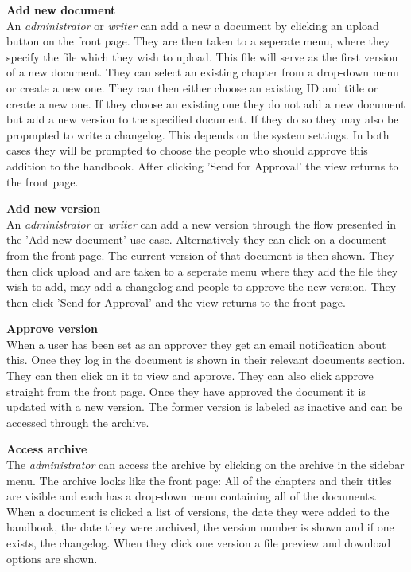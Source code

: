 \textbf{Add new document}
\\
An \textit{administrator} or \textit{writer} can add a new a document by clicking an upload button on the front page.
They are then taken to a seperate menu, where they specify the file which they wish to upload.
This file will serve as the first version of a new document.
They can select an existing chapter from a drop-down menu or create a new one. 
They can then either choose an existing ID and title or create a new one.
If they choose an existing one they do not add a new document but add a new version to the specified document.
If they do so they may also be propmpted to write a changelog.
This depends on the system settings.
In both cases they will be prompted to choose the people who should approve this addition to the handbook.
After clicking 'Send for Approval' the view returns to the front page.

\textbf{Add new version}
\\
An \textit{administrator} or \textit{writer} can add a new version through the flow presented in the 'Add new document' use case.
Alternatively they can click on a document from the front page.
The current version of that document is then shown.
They then click upload and are taken to a seperate menu where they add the file they wish to add, may add a changelog and people to approve the new version.
They then click 'Send for Approval' and the view returns to the front page.

\textbf{Approve version}
\\
When a user has been set as an approver they get an email notification about this.
Once they log in the document is shown in their relevant documents section.
They can then click on it to view and approve.
They can also click approve straight from the front page.
Once they have approved the document it is updated with a new version.
The former version is labeled as inactive and can be accessed through the archive.

\textbf{Access archive}
\\
The \textit{administrator} can access the archive by clicking on the archive in the sidebar menu.
The archive looks like the front page:
All of the chapters and their titles are visible and each has a drop-down menu containing all of the documents.
When a document is clicked a list of versions, the date they were added to the handbook, the date they were archived, the version number is shown and if one exists, the changelog.
When they click one version a file preview and download options are shown.

